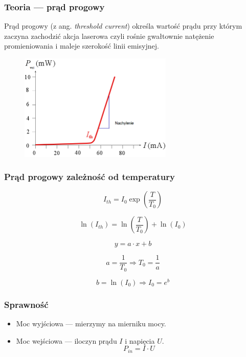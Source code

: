 \documentclass[xcolor={dvipsnames,table}]{beamer}
\begin{document}
\begin{frame}
\frametitle{Teoria --- prąd progowy}
Prąd progowy (z ang. \textit{threshold current}) określa wartość prądu przy którym zaczyna zachodzić akcja laserowa czyli rośnie gwałtownie natężenie promieniowania i maleje szerokość linii emisyjnej.
\begin{figure}
   \includegraphics[width=0.65\textwidth,natwidth=69,natheight=87]{slope.png}
\end{figure}
\end{frame}

\begin{frame}
\frametitle{Prąd progowy zależność od temperatury}

\begin{equation*}
I_{th} = I_0 \exp \left( \frac{T}{T_0} \right)
\end{equation*}

\begin{equation*}
\ln (I_{th}) =  \ln \left( \frac{T}{T_0} \right) + \ln(I_{0})
\end{equation*}

\begin{equation*}
y = a \cdot x + b
\end{equation*}

\begin{equation*}
a = \frac{1}{T_0} \Rightarrow T_0 = \frac{1}{a}
\end{equation*}

\begin{equation*}
b = \ln(I_0) \Rightarrow I_0 = e^b
\end{equation*}
\end{frame}

\begin{frame}
\frametitle{Sprawność}
\begin{itemize}
\item Moc wyjściowa  ---  mierzymy na mierniku mocy.
\item Moc wejściowa --- iloczyn prądu $I$ i napięcia $U$.
\begin{equation*}
P_{in} = I \cdot U
\end{equation*}
\end{itemize}
\end{frame}
\end{document}
